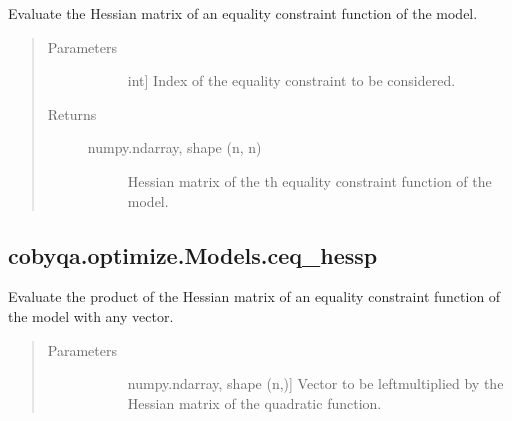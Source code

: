 \documentclass[letterpaper,10pt,english]{sphinxmanual}
\begin{document}
\begin{fulllineitems}
\begin{fulllineitems}
\label{\detokenize{refs/generated/cobyqa.optimize.Models.ceq_hess:cobyqa.optimize.Models.ceq_hess}}
\sphinxAtStartPar
Evaluate the Hessian matrix of an equality constraint function of the
model.
\begin{quote}\begin{description}
\item[{Parameters}] \leavevmode\begin{description}
\item[{}] \leavevmode{[}int{]}
\sphinxAtStartPar
Index of the equality constraint to be considered.

\end{description}

\item[{Returns}] \leavevmode\begin{description}
\item[{numpy.ndarray, shape (n, n)}] \leavevmode
\sphinxAtStartPar
Hessian matrix of the \sphinxhyphen{}th equality constraint function of the
model.

\end{description}

\end{description}\end{quote}

\end{fulllineitems}



\subsection{cobyqa.optimize.Models.ceq\_hessp}
\label{\detokenize{refs/generated/cobyqa.optimize.Models.ceq_hessp:cobyqa-optimize-models-ceq-hessp}}\label{\detokenize{refs/generated/cobyqa.optimize.Models.ceq_hessp::doc}}

\begin{fulllineitems}
\label{\detokenize{refs/generated/cobyqa.optimize.Models.ceq_hessp:cobyqa.optimize.Models.ceq_hessp}}
\sphinxAtStartPar
Evaluate the product of the Hessian matrix of an equality constraint
function of the model with any vector.
\begin{quote}\begin{description}
\item[{Parameters}] \leavevmode\begin{description}
\item[{}] \leavevmode{[}numpy.ndarray, shape (n,){]}
\sphinxAtStartPar
Vector to be left\sphinxhyphen{}multiplied by the Hessian matrix of the quadratic
function.


\end{description}
\end{description}
\end{quote}
\end{fulllineitems}
\end{fulllineitems}
\end{document}
